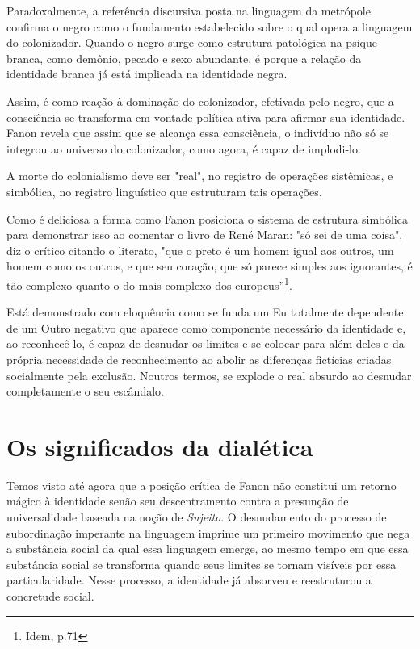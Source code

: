 Paradoxalmente, a referência discursiva posta na linguagem da metrópole
confirma o negro como o fundamento estabelecido sobre o qual opera a
linguagem do colonizador. Quando o negro surge como estrutura patológica
na psique branca, como demônio, pecado e sexo abundante, é porque a
relação da identidade branca já está implicada na identidade negra.

Assim, é como reação à dominação do colonizador, efetivada pelo negro,
que a consciência se transforma em vontade política ativa para afirmar
sua identidade. Fanon revela que assim que se alcança essa consciência,
o indivíduo não só se integrou ao universo do colonizador, como agora, é
capaz de implodi-lo.

A morte do colonialismo deve ser "real", no registro de operações
sistêmicas, e simbólica, no registro linguístico que estruturam tais
operações.

Como é deliciosa a forma como Fanon posiciona o sistema de estrutura
simbólica para demonstrar isso ao comentar o livro de René Maran: "só
sei de uma coisa", diz o crítico citando o literato, "que o preto é um
homem igual aos outros, um homem como os outros, e que seu coração, que
só parece simples aos ignorantes, é tão complexo quanto o do mais
complexo dos europeus''\footnote{Idem, p.71}.

Está demonstrado com eloquência como se funda um Eu totalmente
dependente de um Outro negativo que aparece como componente necessário
da identidade e, ao reconhecê-lo, é capaz de desnudar os limites e se
colocar para além deles e da própria necessidade de reconhecimento ao
abolir as diferenças fictícias criadas socialmente pela exclusão.
Noutros termos, se explode o real absurdo ao desnudar completamente o
seu escândalo.

\chapter{Os significados da dialética}

Temos visto até agora que a posição crítica de Fanon não constitui um
retorno mágico à identidade senão seu descentramento contra a presunção
de universalidade baseada na noção de \emph{Sujeito}. O desnudamento do
processo de subordinação imperante na linguagem imprime um primeiro
movimento que nega a substância social da qual essa linguagem emerge, ao
mesmo tempo em que essa substância social se transforma quando seus
limites se tornam visíveis por essa particularidade. Nesse processo, a
identidade já absorveu e reestruturou a concretude social.

